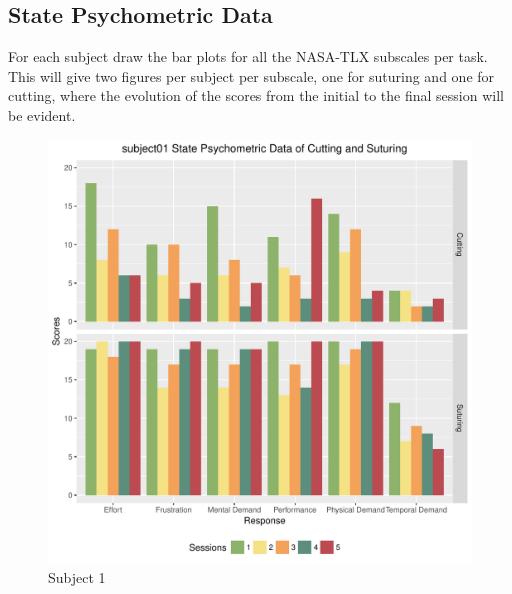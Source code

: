 \documentclass[12pt,epsf]{report}
\begin{document}
\subsection*{State Psychometric Data}
For each subject draw the bar plots for all the NASA-TLX subscales per task. This will give two figures per subject per subscale, one for suturing and one for cutting, where the evolution of the scores from the initial to the final session will be evident. \\
\begin{figure}[!htb]
	\begin{minipage}[c]{0.5\linewidth}
	\includegraphics[width=\linewidth]{subject01_State_Psychometric_Data_of_Cutting_and_Suturing.pdf}
	\caption{Subject 1 }
	\end{minipage}
	\hfill
	\begin{minipage}[c]{0.5\linewidth}

\end{minipage}
\end{figure}
\end{document}
